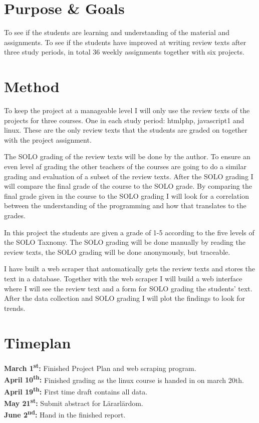 \documentclass[twoside,twocolumn,a4paper,12pt,english]{article}
\begin{document}

\section{Purpose \& Goals}
To see if the students are learning and understanding of the material and assignments. To see if the students have improved at writing review texts after three study periods, in total 36 weekly assignments together with six projects.




\section{Method}
To keep the project at a manageable level I will only use the review texts of the projects for three courses. One in each study period: htmlphp, javascript1 and linux. These are the only review texts that the students are graded on together with the project assignment.

The SOLO grading of the review texts will be done by the author. To ensure an even level af grading the other teachers of the courses are going to do a similar grading and evaluation of a subset of the review texts. After the SOLO grading I will compare the final grade of the course to the SOLO grade. By comparing the final grade given in the course to the SOLO grading I will look for a correlation between the understanding of the programming and how that translates to the grades.

In this project the students are given a grade of 1-5 according to the five levels of the SOLO Taxnomy. The SOLO grading will be done manually by reading the review texts, the SOLO grading will be done anonymously, but traceable.

I have built a web scraper that automatically gets the review texts and stores the text in a database. Together with the web scraper I will build a web interface where I will see the review text and a form for SOLO grading the students' text. After the data collection and SOLO grading I will plot the findings to look for trends.




\section{Timeplan}
\textbf{March 1\textsuperscript{st}:} Finished Project Plan and web scraping program.\\
\textbf{April 10\textsuperscript{th}:} Finished grading as the linux course is handed in on march 20th.\\
\textbf{April 19\textsuperscript{th}:} First time draft contains all data.\\
\textbf{May 21\textsuperscript{st}:} Submit abstract for Lärarlärdom.\\
\textbf{June 2\textsuperscript{nd}:} Hand in the finished report.\\
\end{document}
